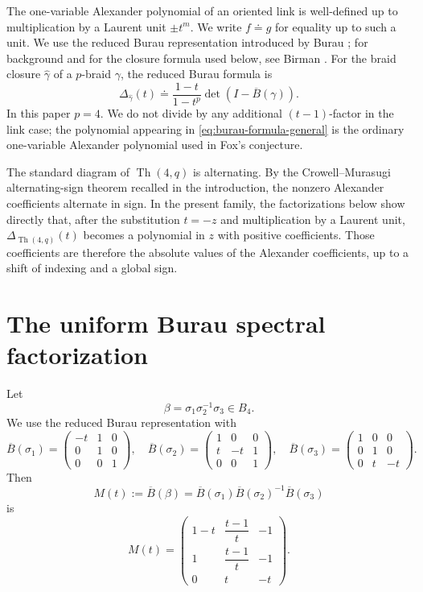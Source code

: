\documentclass[11pt]{amsart}
\newcommand{\Th}{\operatorname{Th}}
\newcommand{\Bur}{\overline B}
\newcommand{\dd}{\doteq}
\begin{document}
The one-variable Alexander polynomial of an oriented link is well-defined up to multiplication by a Laurent unit \(\pm t^m\).  We write \(f\dd g\) for equality up to such a unit.  We use the reduced Burau representation introduced by Burau \cite{burau}; for background and for the closure formula used below, see Birman \cite{birman}.  For the braid closure \(\widehat{\gamma}\) of a \(p\)-braid \(\gamma\), the reduced Burau formula is
\begin{equation}\label{eq:burau-formula-general}
        \Delta_{\widehat{\gamma}}(t)
        \dd
        \frac{1-t}{1-t^p}\det\left(I-\Bur(\gamma)\right).
\end{equation}
In this paper \(p=4\).  We do not divide by any additional \((t-1)\)-factor in the link case; the polynomial appearing in \eqref{eq:burau-formula-general} is the ordinary one-variable Alexander polynomial used in Fox's conjecture.

The standard diagram of \(\Th(4,q)\) is alternating.  By the Crowell--Murasugi alternating-sign theorem recalled in the introduction, the nonzero Alexander coefficients alternate in sign.  In the present family, the factorizations below show directly that, after the substitution \(t=-z\) and multiplication by a Laurent unit, \(\Delta_{\Th(4,q)}(t)\) becomes a polynomial in \(z\) with positive coefficients.  Those coefficients are therefore the absolute values of the Alexander coefficients, up to a shift of indexing and a global sign.

\section{The uniform Burau spectral factorization}\label{sec:burau}

Let
\[
        \beta=\sigma_1\sigma_2^{-1}\sigma_3\in B_4.
\]
We use the reduced Burau representation with
\[
\Bur(\sigma_1)=
\begin{pmatrix}
-t&1&0\\
0&1&0\\
0&0&1
\end{pmatrix},
\quad
\Bur(\sigma_2)=
\begin{pmatrix}
1&0&0\\
t&-t&1\\
0&0&1
\end{pmatrix},
\quad
\Bur(\sigma_3)=
\begin{pmatrix}
1&0&0\\
0&1&0\\
0&t&-t
\end{pmatrix}.
\]
Then
\[
        M(t):=\Bur(\beta)
        =\Bur(\sigma_1)\Bur(\sigma_2)^{-1}\Bur(\sigma_3)
\]
is
\begin{equation}\label{eq:burau-matrix}
M(t)=
\begin{pmatrix}
1-t&\dfrac{t-1}{t}&-1\\[4pt]
1&\dfrac{t-1}{t}&-1\\[4pt]
0&t&-t
\end{pmatrix}.
\end{equation}
\end{document}
